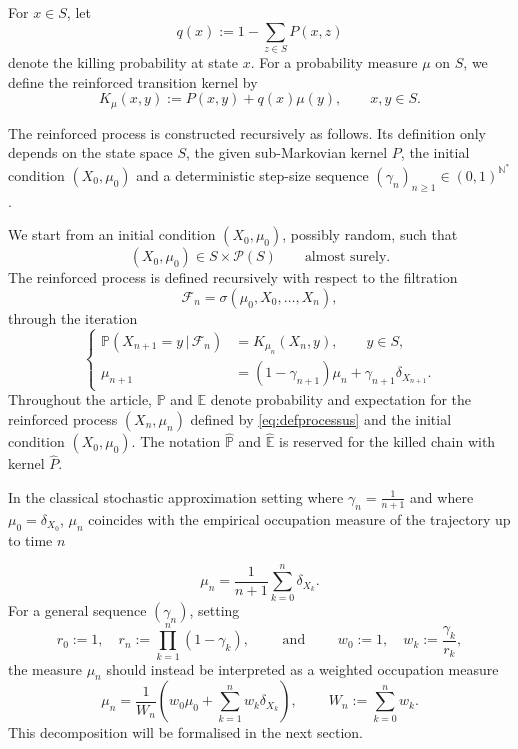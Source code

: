 \documentclass[10pt,letterpaper]{article}
\theoremstyle{compactplain}
\theoremstyle{compactdefinition}
\newcommand{\1}{\mathds{1}}
\begin{document}
For \(x\in S\), let
\[
q(x):=1-\sum_{z\in S}P(x,z)
\]
denote the killing probability at state \(x\). For a probability measure \(\mu\) on \(S\), we define the reinforced transition kernel by
\begin{equation}\label{eq:defnoyauressamp}
K_\mu(x,y):=P(x,y)+q(x)\mu(y),
\qquad x,y\in S.
\end{equation}


The reinforced process is constructed recursively as follows. Its definition only depends on the state space $S$, the given sub-Markovian kernel $P$, the initial
condition \((X_0,\mu_0)\) and a deterministic step-size sequence $(\gamma_n)_{n\geq1}\in(0,1)^{\mathbb{N}^*}$.

\medskip{}

We start from an initial condition \((X_0,\mu_0)\), possibly random, such that
\[
(X_0,\mu_0)\in S\times\mathcal P(S)
\qquad\text{almost surely}.
\]
The reinforced process is defined recursively with respect to the filtration
\[
\mathcal F_n=\sigma(\mu_0,X_0,\ldots,X_n),
\]
through the iteration
\begin{equation} \label{eq:defprocessus}
    \left\{
\begin{aligned}
\mathbb P(X_{n+1}=y\,|\,\mathcal F_n)
&=
K_{\mu_n}(X_n,y),
\qquad y\in S,\\
\mu_{n+1}
&=
(1-\gamma_{n+1})\mu_n+\gamma_{n+1}\delta_{X_{n+1}}.
\end{aligned}
\right.
\end{equation}
Throughout the article, \(\mathbb P\) and \(\mathbb E\) denote probability and
expectation for the reinforced process \((X_n,\mu_n)\) defined by \eqref{eq:defprocessus} and the initial condition  $(X_0,\mu_0)$. The notation
\(\widehat{\mathbb P}\) and \(\widehat{\mathbb E}\) is reserved for the killed
chain with kernel \(\widehat P\). 


In the classical stochastic approximation setting where $\gamma_n=\frac1{n+1}$ and where $\mu_0=\delta_{X_0}$, $\mu_n$ coincides with the empirical occupation measure of the trajectory up to time $n$

\[\mu_n=\frac{1}{n+1}\sum_{k=0}^n\delta_{X_k}.\]
For a general sequence $(\gamma_n)$, setting 
\[
r_0:= 1, \quad r_n:= \prod_{k=1}^n (1-\gamma_k), \qquad \text{ and } \qquad w_0:=1, \quad w_k:= \frac{\gamma_k}{r_k},
\]
the measure $\mu_n$ should instead be interpreted as a weighted occupation measure
\[
\mu_n
=
\frac1{W_n}
\left(
w_0\mu_0+\sum_{k=1}^n w_k\delta_{X_k}
\right), \qquad  \ W_n := \sum_{k=0}^n w_k.
\]
This decomposition will be formalised in the next section.
\end{document}
